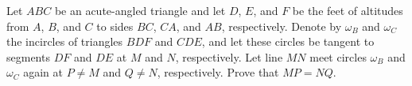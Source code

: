 Let $ABC$ be an acute-angled triangle and let $D$, $E$, and $F$ be the feet of altitudes from $A$, $B$, and $C$ to sides $BC$, $CA$, and $AB$, respectively. Denote by $\omega_B$ and $\omega_C$ the incircles of triangles $BDF$ and $CDE$, and let these circles be tangent to segments $DF$ and $DE$ at $M$ and $N$, respectively. Let line $MN$ meet circles $\omega_B$ and $\omega_C$ again at $P \neq M$ and $Q \neq N$, respectively. Prove that $MP = NQ$.
